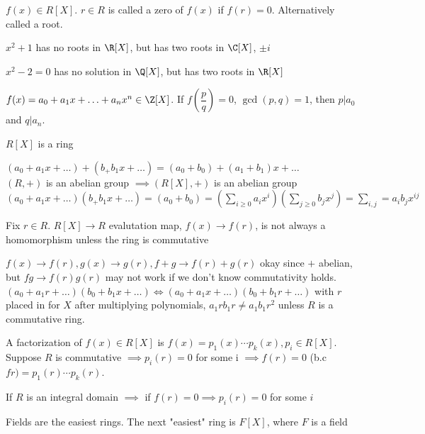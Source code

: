 \documentclass[10pt]{article}
\begin{document}
\begin{defn}
    $f(x) \in R[X]$. $r \in R$ is called a zero of $f(x)$ if $f(r) = 0$. Alternatively called a root.
\end{defn}

$x^2 + 1$ has no roots in $\R[X]$, but has two roots in $\C[X]$, $\pm i$

$x^2 - 2 = 0$ has no solution in $\Q[X]$, but has two roots in $\R[X]$

\begin{defn}
    $f(x) = a_0 + a_1x + \ldots + a_nx^n \in \Z[X]$. If $f(\dfrac{p}{q}) = 0$, $\gcd(p, q) = 1$, then $p | a_0$ and $q | a_n$.
\end{defn}

\begin{lem}
    $R[X]$ is a ring
\end{lem}
$(a_0 + a_1x + \ldots) + (b_ + b_1x + \ldots) = (a_0 + b_0) + (a_1 + b_1)x + \ldots$\\
$(R, +)$ is an abelian group $\implies (R[X], +)$ is an abelian group\\
$(a_0 + a_1x + \ldots)(b_ + b_1x + \ldots) = (a_0 + b_0) = (\sum\limits_{i \geq 0} a_i x^i)(\sum\limits_{j \geq 0}b_jx^j) = \sum\limits_{i, j} = a_ib_jx^{ij}$

\begin{rmk}
    Fix $r \in R$. $R[X] \to R$ evalutation map, $f(x) \to f(r)$, is not always a homomorphism unless the ring is commutative
\end{rmk}
$f(x) \to f(r), g(x) \to g(r), f + g \to f(r) + g(r)$ okay since $+$ abelian, but $fg \to f(r)g(r)$ may not work if we don't know commutativity holds.
$(a_0 + a_1r +\ldots)(b_0 + b_1x + \ldots) \iff (a_0 + a_1x + \ldots)(b_0 + b_1r + \ldots)$ with $r$ placed in for $X$ after multiplying polynomials, $a_1rb_1r \neq a_1b_1r^2$ unless $R$ is a commutative ring.

\begin{defn}
    A factorization of $f(x) \in R[X]$ is $f(x) = p_1(x) \cdots p_k(x), p_i \in R[X]$. Suppose $R$ is commutative $\implies p_i(r) = 0$ for some i $\implies f(r) = 0$ (b.c $fr) = p_1(r) \cdots p_k(r)$.

    If $R$ is an integral domain $\implies$ if $f(r) = 0 \implies p_i(r) = 0$ for some $i$
\end{defn}

\begin{rmk}
    Fields are the easiest rings. The next "easiest" ring is $F[X]$, where $F$ is a field
\end{rmk}
\end{document}
